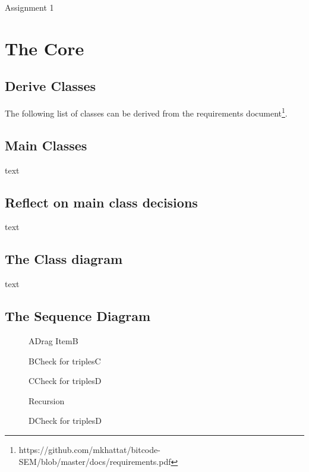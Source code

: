 \documentclass{article}
\begin{document}
\begin{titlepage}
	\Huge{Assignment 1}
\end{titlepage}


\section{The Core}

\subsection{Derive Classes}

The following list of classes can be derived from the requirements document\footnote{https://github.com/mkhattat/bitcode-SEM/blob/master/docs/requirements.pdf}.


\subsection{Main Classes}
text

\subsection{Reflect on main class decisions}
text

\subsection{The Class diagram}
text

\subsection{The Sequence Diagram}
	\begin{figure}
		\centering
		\begin{sequencediagram}
			\begin{call}{A}{Drag Item}{B}{}
				\begin{call}{B}{Check for triples}{C}{}
					\begin{call}{C}{Check for triples}{D}{}
						\begin{sdblock}{Recursion}{}
							\begin{call}{D}{Check for triples}{D}{}
							\end{call}
						\end{sdblock}
					\end{call}
				\end{call}
			\end{call}
		\end{sequencediagram}
	\end{figure}
\end{document}
